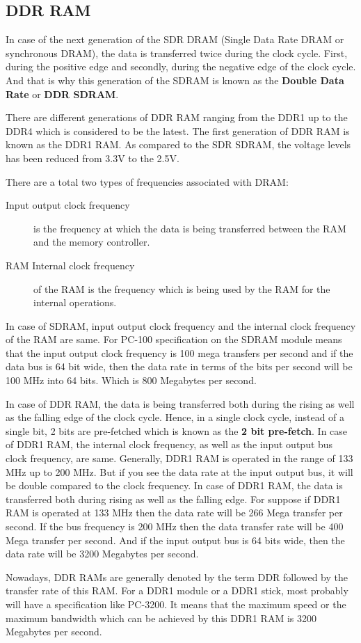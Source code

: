 \subsection{DDR RAM} 
In case of the next generation of the SDR DRAM (Single Data Rate DRAM or synchronous DRAM), the data is transferred twice during the clock cycle. First, during the positive edge and secondly, during the negative edge of the clock cycle. And that is why this generation of the SDRAM is known as the \textbf{Double Data Rate} or \textbf{DDR SDRAM}. 

\par There are different generations of DDR RAM ranging from the DDR1 up to the DDR4 which is considered to be the latest. The first generation of DDR RAM is known as the DDR1 RAM. As compared to the SDR SDRAM, the voltage levels has been reduced from 3.3V to the 2.5V.

\par There are a total two types of frequencies associated with DRAM:

\begin{description}
	\item[Input output clock frequency] is the frequency at which the data is being transferred between the RAM and the memory controller.
	\item[RAM Internal clock frequency] of the RAM is the frequency which is being used by the RAM for the internal operations. 
\end{description}

In case of SDRAM, input output clock frequency and the internal clock frequency of the RAM are same. For \eg PC-100 specification on the SDRAM module means that the input output clock frequency is 100 mega transfers per second and if the data bus is 64 bit wide, then the data rate in terms of the bits per second will be 100 MHz into 64 bits. Which is 800 Megabytes per second.

\par In case of DDR RAM, the data is being transferred both during the rising as well as the falling edge of the clock cycle. Hence, in a single clock cycle, instead of a single bit, 2 bits are pre-fetched which is known as the \textbf{2 bit pre-fetch}. In case of DDR1 RAM, the internal clock frequency, as well as the input output bus clock frequency, are same. Generally, DDR1 RAM is operated in the range of 133 MHz up to 200 MHz. But if you see the data rate at the input output bus, it will be double compared to the clock frequency. In case of DDR1 RAM, the data is transferred both during rising as well as the falling edge. For \eg suppose if DDR1 RAM is operated at 133 MHz then the data rate will be 266 Mega transfer per second. If the bus frequency is 200 MHz then the data transfer rate will be 400 Mega transfer per second. And if the input output bus is 64 bits wide, then the data rate will be 3200 Megabytes per second.

\par Nowadays, DDR RAMs are generally denoted by the term DDR followed by the transfer rate of this RAM. For \eg a DDR1 module or a DDR1 stick, most probably will have a specification like PC-3200. It means that the maximum speed or the maximum bandwidth which can be achieved by this DDR1 RAM is 3200 Megabytes per second.